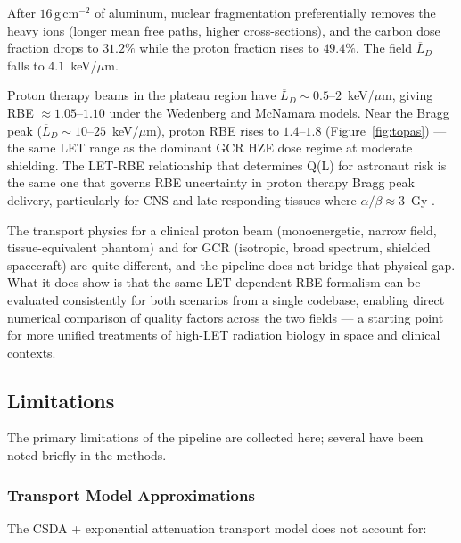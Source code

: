 After $16\,\mathrm{g\,cm^{-2}}$ of aluminum, nuclear fragmentation
preferentially removes the heavy ions (longer mean free paths,
higher cross-sections), and the carbon dose fraction drops to $31.2\%$
while the proton fraction rises to $49.4\%$.
The field $\overline{L}_D$ falls to $4.1$~keV/$\mu$m.

Proton therapy beams in the plateau region have
$\overline{L}_D \sim 0.5$--$2$~keV/$\mu$m, giving
RBE $\approx 1.05$--$1.10$ under the Wedenberg and McNamara models.
Near the Bragg peak ($\overline{L}_D \sim 10$--$25$~keV/$\mu$m),
proton RBE rises to $1.4$--$1.8$ (Figure~\ref{fig:topas}) — the same
LET range as the dominant GCR HZE dose regime at moderate shielding.
The LET-RBE relationship that determines Q(L) for astronaut risk is the same
one that governs RBE uncertainty in proton therapy Bragg peak delivery,
particularly for CNS and late-responding tissues where $\alpha/\beta \approx 3$~Gy
\citep{paganetti2014}.

The transport physics for a clinical proton beam (monoenergetic, narrow
field, tissue-equivalent phantom) and for GCR (isotropic, broad spectrum,
shielded spacecraft) are quite different, and the pipeline does not bridge
that physical gap.
What it does show is that the same LET-dependent RBE formalism can be
evaluated consistently for both scenarios from a single codebase,
enabling direct numerical comparison of quality factors across the two
fields — a starting point for more unified treatments of high-LET
radiation biology in space and clinical contexts.

\subsection{Limitations}
\label{sec:discuss_limits}

The primary limitations of the pipeline are collected here; several have
been noted briefly in the methods.

\subsubsection{Transport Model Approximations}

The CSDA + exponential attenuation transport model does not account for:

